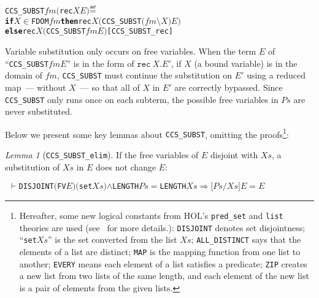 \documentclass[GCNS]{yincog}
\renewcommand{\HOLinline}[1]{\mbox{\textup{\texttt{#1}}}}
\renewcommand{\HOLConst}[1]{\texttt{#1}}
\renewcommand{\HOLFreeVar}[1]{\ensuremath{\mathit{#1}}}
\renewcommand{\HOLKeyword}[1]{{\textbf{\textsf{#1}}}}
\renewcommand{\HOLSymConst}[1]{#1}
\renewcommand{\HOLTokenConj}{\ensuremath{\wedge}}
\renewcommand{\HOLTokenIn}{\ensuremath{\in}}
\renewcommand{\HOLTokenDefEquality}{\ensuremath{\mathrel{\overset{\makebox [0pt]{\text{\tiny \textsf{def}}}}{=}}}}
\renewcommand{\HOLTokenTurnstile}{\ensuremath{\:\:\vdash}}
\theoremstyle{remark}
\theoremstyle{theorem}
\newtheorem{lemma}[definition]{Lemma}
\theoremstyle{remark}
\renewcommand{\HOLTokenImp}{\ensuremath{\Longrightarrow}}
\newcommand{\recu}[2]{\mathtt{rec}\: #1 . #2}
\begin{document}
\begin{alltt}
   \HOLConst{CCS\_SUBST} \HOLFreeVar{fm} \ensuremath{(}\HOLConst{rec} \HOLFreeVar{X} \HOLFreeVar{E}\ensuremath{)} \HOLTokenDefEquality{}
     \HOLKeyword{if} \HOLFreeVar{X} \HOLSymConst{\HOLTokenIn{}} \HOLConst{FDOM} \HOLFreeVar{fm} \HOLKeyword{then} \HOLConst{rec} \HOLFreeVar{X} \ensuremath{(}\HOLConst{CCS\_SUBST} \ensuremath{(}\HOLFreeVar{fm} \HOLSymConst{\ensuremath{\setminus}} \HOLFreeVar{X}\ensuremath{)} \HOLFreeVar{E}\ensuremath{)}
     \HOLKeyword{else} \HOLConst{rec} \HOLFreeVar{X} \ensuremath{(}\HOLConst{CCS\_SUBST} \HOLFreeVar{fm} \HOLFreeVar{E}\ensuremath{)}\hfill{[CCS\_SUBST\_rec]}
\end{alltt}
%
Variable substitution only occurs on free variables. When the term
$E$ of ``\HOLinline{\HOLConst{CCS\_SUBST}\\\;\HOLFreeVar{fm}\\\;\HOLFreeVar{E}}''
is in the form of $\recu X E'$, if $X$ (a bound variable) is in the domain
of \HOLinline{\HOLFreeVar{fm}}, \HOLinline{\HOLConst{CCS\_SUBST}} must continue
the substitution on $E'$ using a reduced map~--- without $X$~--- so that
all  of $X$ in $E'$ are correctly bypassed. Since
\HOLinline{\HOLConst{CCS\_SUBST}} only runs once on each subterm, the possible
free variables in \HOLinline{\HOLFreeVar{Ps}} are never substituted.

Below we present some key lemmas about
\HOLinline{\HOLConst{CCS\_SUBST}}, omitting the proofs\footnote{Hereafter,
some new logical constants from HOL's \texttt{pred\_set} and
\texttt{list} theories are used (see~\cite{holdesc} for more details.):
\HOLinline{\HOLConst{DISJOINT}} denotes set disjointness; ``\HOLinline{\HOLConst{set}\\\;\HOLFreeVar{Xs}}''
is the set converted from the list \HOLinline{\HOLFreeVar{Xs}};
\HOLinline{\HOLConst{ALL\_DISTINCT}} says that the elements of a list are
distinct; \HOLinline{\HOLConst{MAP}} is the mapping function from one list
to another; \HOLinline{\HOLConst{EVERY}} means each element of a list satisfies
a predicate; \HOLinline{\HOLConst{ZIP}} creates a new list from two lists
of the same length, and each element of the new list is a pair of elements
from the given lists.}:

\begin{lemma}[\texttt{CCS\_SUBST\_elim}]
If the free variables of $E$  disjoint with
\HOLinline{\HOLFreeVar{Xs}}, a substitution of
\HOLinline{\HOLFreeVar{Xs}} in $E$ does not change $E$:
%
\begin{alltt}
\HOLTokenTurnstile{} \HOLConst{DISJOINT} \ensuremath{(}\HOLConst{FV} \HOLFreeVar{E}\ensuremath{)} \ensuremath{(}\HOLConst{set} \HOLFreeVar{Xs}\ensuremath{)} \HOLSymConst{\HOLTokenConj{}} \HOLConst{LENGTH} \HOLFreeVar{Ps} \HOLSymConst{\ensuremath{=}} \HOLConst{LENGTH} \HOLFreeVar{Xs} \HOLSymConst{\HOLTokenImp{}} \ensuremath{[}\HOLFreeVar{Ps}\ensuremath{/}\HOLFreeVar{Xs}\ensuremath{]} \HOLFreeVar{E} \HOLSymConst{\ensuremath{=}} \HOLFreeVar{E}
\end{alltt}
%
\end{lemma}
\end{document}
